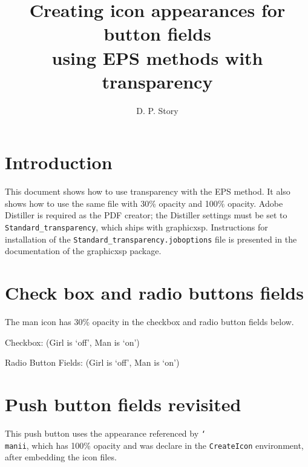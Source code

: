 \documentclass{article}
\title{Creating icon appearances for button fields\texorpdfstring{\\[1ex]}{} using EPS methods with transparency}
\author{D. P. Story}
\newcommand{\cs}[1]{\texttt{\char`\\#1}}
\begin{document}
\maketitle

\section{Introduction}

This document shows how to use transparency with the EPS method. It also shows how to use the same file
with 30\% opacity and 100\% opacity. \textsf{Adobe Distiller} is required as the PDF creator; the
\textsf{Distiller} settings must be set to \texttt{Standard\_transparency}, which ships with
\textsf{graphicxsp}. Instructions for installation of the \texttt{Standard\_transparency.joboptions}
file is presented in the documentation of the \textsf{graphicxsp} package.

\section{Check box and radio buttons fields}

The man icon has 30\% opacity in the checkbox and radio button fields below.\vcgBdry[6pt]

Checkbox:
\quad(Girl is `off', Man is `on')\vcgBdry[6pt]

Radio Button Fields: \quad {}\quad{}\quad(Girl is `off', Man is `on')\hfill
{}


\section{Push button fields revisited}

This push button uses the appearance referenced by \cs{manii}, which has 100\% opacity and was
declare in the \texttt{CreateIcon} environment, after embedding the icon files. \vcgBdry[6pt]

\end{document}
